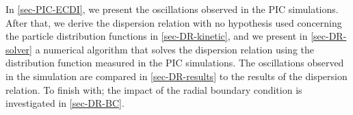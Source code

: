 In \cref{sec-PIC-ECDI}, we present the oscillations observed in the \ac{PIC} simulations.
After that, we derive the dispersion relation with no hypothesis used concerning the particle distribution functions in \cref{sec-DR-kinetic}, and we present in \cref{sec-DR-solver} a numerical algorithm that solves the dispersion relation using the distribution function measured in the \ac{PIC} simulations.
The oscillations observed in the simulation are compared in \cref{sec-DR-results} to the results of the dispersion relation.
To finish with; the impact of the radial boundary condition is investigated in \cref{sec-DR-BC}.







